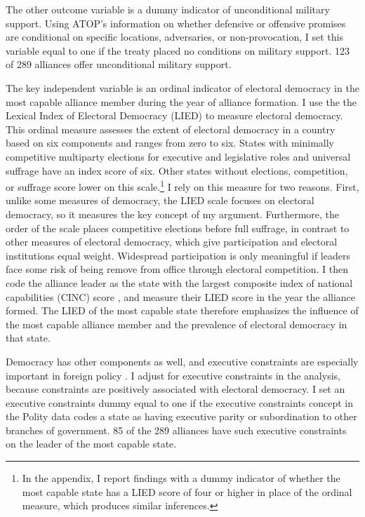 \documentclass[12pt]{article}
\begin{document}
The other outcome variable is a dummy indicator of unconditional military support. 
Using ATOP's information on whether defensive or offensive promises are conditional on specific locations, adversaries, or non-provocation, I set this variable equal to one if the treaty placed no conditions on military support.
123 of 289 alliances offer unconditional military support. 


The key independent variable is an ordinal indicator of electoral democracy in the most capable alliance member during the year of alliance formation. 
I use the the Lexical Index of Electoral Democracy (LIED) \citep{Skaaningetal2015} to measure electoral democracy.
This ordinal measure assesses the extent of electoral democracy in a country based on six components and ranges from zero to six.  
States with minimally competitive multiparty elections for executive and legislative roles and universal suffrage have an index score of six.
Other states without elections, competition, or suffrage score lower on this scale.\footnote{In the appendix, I report findings with a dummy indicator of whether the most capable state has a LIED score of four or higher in place of the ordinal measure, which produces similar inferences.}
I rely on this measure for two reasons. 
First, unlike some measures of democracy, the LIED scale focuses on electoral democracy, so it measures the key concept of my argument.
Furthermore, the order of the scale places competitive elections before full suffrage, in contrast to other measures of electoral democracy, which give participation and electoral institutions equal weight. 
Widespread participation is only meaningful if leaders face some risk of being remove from office through electoral competition. 
I then code the alliance leader as the state with the largest composite index of national capabilities (CINC) score \citep{SingerCINC1988}, and measure their LIED score in the year the alliance formed.
The LIED of the most capable state therefore emphasizes the influence of the most capable alliance member and the prevalence of electoral democracy in that state.


Democracy has other components as well, and executive constraints are especially important in foreign policy \citep{MilnerTingley2015}. 
I adjust for executive constraints in the analysis, because constraints are positively associated with electoral democracy.
I set an executive constraints dummy equal to one if the executive constraints concept in the Polity data codes a state as having executive parity or subordination to other branches of government.
85 of the 289 alliances have such executive constraints on the leader of the most capable state.
\end{document}
